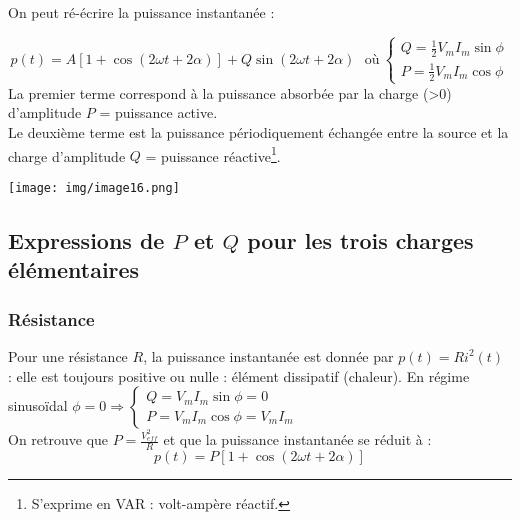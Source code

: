 \documentclass[british,french,11pt, a4paper, openany]{book}
\begin{document}
		On peut ré-écrire la puissance instantanée : 
		
		
		
		
		
		\begin{equation}
		p(t) = A[1 + \cos(2\omega t + 2\alpha)] + Q \sin(2\omega t + 2\alpha)\ \ \ \text{où}\ \left\{\begin{array}{l}
		Q = \frac{1}{2}V_mI_m\sin\phi\\
		P = \frac{1}{2}V_mI_m\cos\phi
		\end{array}\right.
		\end{equation}
		La premier terme correspond à la puissance absorbée par la charge (>0) d'amplitude $P$ = puissance active.\\
		Le deuxième terme est la puissance périodiquement échangée entre la source et la charge d'amplitude $Q$ = puissance réactive\footnote{S'exprime en VAR : volt-ampère réactif.}.
		\begin{center}
			\texttt{[image: img/image16.png]}
		\end{center}
		
		\setcounter{subsection}{3}
		\subsection{Expressions de $P$ et $Q$ pour les trois charges élémentaires}
		\subsubsection{Résistance}
		Pour une résistance $R$, la puissance instantanée est donnée par $p(t) = Ri^2(t)$ : elle est toujours positive ou nulle : élément dissipatif (chaleur).
		En régime sinusoïdal $\phi = 0 \Rightarrow  \left\{\begin{array}{l}
		Q = V_mI_m\sin\phi = 0\\
		P = V_mI_m\cos\phi = V_mI_m
		\end{array}\right.$\\
		On retrouve que $P = \frac{V_{eff}^2}{R}$ et que la puissance instantanée se réduit à :
		\begin{equation}
		p(t) = P[1 + \cos(2\omega t + 2\alpha)]
		\end{equation}
		
\end{document}
